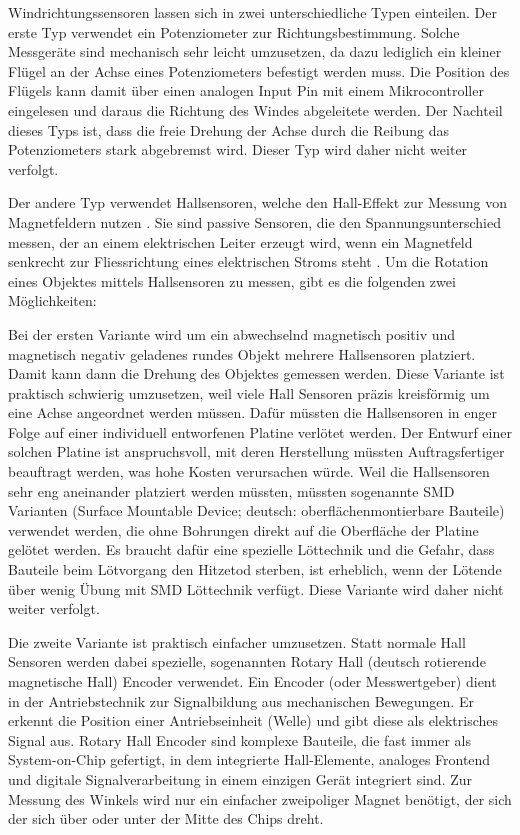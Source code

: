 Windrichtungssensoren lassen sich in zwei unterschiedliche Typen einteilen. Der erste Typ verwendet ein Potenziometer zur Richtungsbestimmung. Solche Messgeräte sind mechanisch sehr leicht umzusetzen, da dazu lediglich ein kleiner Flügel an der Achse eines Potenziometers befestigt werden muss. Die Position des Flügels kann damit über einen analogen Input Pin mit einem Mikrocontroller eingelesen und daraus die Richtung des Windes abgeleitete werden. Der Nachteil dieses Typs ist, dass die freie Drehung der Achse durch die Reibung das Potenziometers stark abgebremst wird. Dieser Typ wird daher nicht weiter verfolgt.

Der andere Typ verwendet Hallsensoren, welche den Hall-Effekt zur Messung von 
Magnetfeldern nutzen \cite{noauthor_hall-sensor_2023}. Sie sind passive Sensoren, die den Spannungsunterschied messen, der an einem elektrischen Leiter erzeugt wird, wenn ein Magnetfeld senkrecht zur Fliessrichtung eines elektrischen Stroms steht \cite{noauthor_alles_nodate}. Um die Rotation eines Objektes mittels Hallsensoren zu messen, gibt es die folgenden zwei Möglichkeiten:

Bei der ersten Variante wird um ein abwechselnd magnetisch positiv und magnetisch negativ geladenes rundes Objekt mehrere Hallsensoren platziert. Damit kann dann die Drehung des Objektes gemessen werden. Diese Variante ist praktisch schwierig umzusetzen, weil viele Hall Sensoren präzis kreisförmig um eine Achse angeordnet werden müssen. Dafür müssten die Hallsensoren in enger Folge auf einer individuell entworfenen Platine verlötet werden. Der Entwurf einer solchen Platine ist anspruchsvoll, mit deren Herstellung müssten Auftragsfertiger beauftragt werden, was hohe Kosten verursachen würde. Weil die Hallsensoren sehr eng aneinander platziert werden müssten, müssten sogenannte SMD Varianten (Surface Mountable Device; deutsch: oberflächenmontierbare Bauteile) verwendet werden, die ohne Bohrungen direkt auf die Oberfläche der Platine gelötet werden. Es braucht dafür eine spezielle Löttechnik und die Gefahr, dass Bauteile beim Lötvorgang den Hitzetod sterben, ist erheblich, wenn der Lötende über wenig Übung mit SMD Löttechnik verfügt. Diese Variante wird daher nicht weiter verfolgt.

Die zweite Variante ist praktisch einfacher umzusetzen. Statt normale Hall Sensoren werden dabei spezielle, sogenannten Rotary Hall (deutsch rotierende magnetische Hall) Encoder verwendet. Ein Encoder (oder Messwertgeber) dient in der Antriebstechnik zur Signalbildung aus mechanischen Bewegungen. Er erkennt die Position einer Antriebseinheit (Welle) und gibt diese als elektrisches Signal aus. \cite{noauthor_was_nodate} Rotary Hall Encoder sind komplexe Bauteile, die fast immer als System-on-Chip gefertigt, in dem integrierte Hall-Elemente, analoges Frontend und digitale Signalverarbeitung in einem einzigen Gerät integriert sind. Zur Messung des Winkels wird nur ein einfacher zweipoliger Magnet benötigt, der sich der sich über oder unter der Mitte des Chips dreht.

